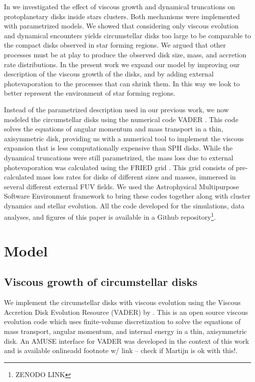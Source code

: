 \documentclass[fleqn,usenatbib]{mnras}
\newcommand\note[1]{{\colorbox{yellow!60}{\color{magenta}#1}}}
\begin{document}
In \citet{concha-ramirez2019} we investigated the effect of viscous growth and dynamical truncations on protoplanetary disks inside stars clusters. Both mechanisms were implemented with parametrized models. We showed that considering only viscous evolution and dynamical encounters yields circumstellar disks too large to be comparable to the compact disks observed in star forming regions. We argued that other processes must be at play to produce the observed disk size, mass, and accretion rate distributions. In the present work we expand our model by improving our description of the viscous growth of the disks, and by adding external photevaporation to the processes that can shrink them. In this way we look to better represent the environment of star forming regions. 

Instead of the parametrized description used in our previous work, we now modeled the circumstellar disks using the numerical code VADER \citep{krumholz2015}. This code solves the equations of angular momentum and mass transport in a thin, axisymmetric disk, providing us with a numerical tool to implement the viscous expansion that is less computationally expensive than SPH disks. While the dynamical truncations were still parametrized, the mass loss due to external photevaporation was calculated using the FRIED grid \citep{haworth2018}. This grid consists of pre-calculated mass loss rates for disks of different sizes and masses, immersed in several different external FUV fields. We used the Astrophysical Multipurpose Software Environment \citep[AMUSE\footnote{\url{http://amusecode.org}},][]{portegieszwart2019} framework to bring these codes together along with cluster dynamics and stellar evolution. All the code developed for the simulations, data analyses, and figures of this paper is available in a Github repository\footnote{ZENODO LINK}.


\section{Model}
\label{sec:model}

\subsection{Viscous growth of circumstellar disks}\label{viscous}
We implement the circumstellar disks with viscous evolution using the Viscous Accretion Disk Evolution Resource (VADER) by \citet{krumholz2015}. This is an open source viscous evolution code which uses finite-volume discretization to solve the equations of mass transport, angular momentum, and internal energy in a thin, axisymmetric disk. An AMUSE interface for VADER was developed in the context of this work and is available online\note{add footnote w/ link -- check if Martijn is ok with this!}.  
\end{document}
